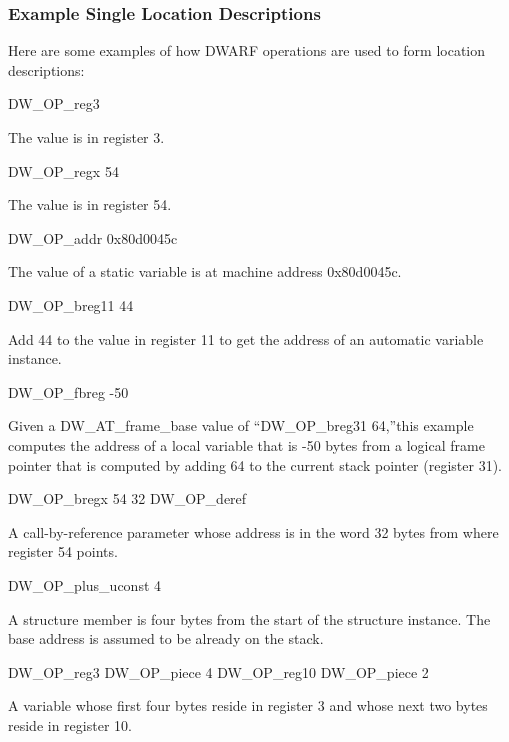 \subsubsection{Example Single Location Descriptions}

Here are some examples of how DWARF operations are used to form location descriptions:

DW\-\_OP\-\_reg3
\begin{myindentpara}{1cm}
The value is in register 3.
\end{myindentpara}

DW\-\_OP\-\_regx 54
\begin{myindentpara}{1cm}
The value is in register 54.
\end{myindentpara}

DW\-\_OP\-\_addr 0x80d0045c
\begin{myindentpara}{1cm}
The value of a static variable is at machine address 0x80d0045c.
\end{myindentpara}

DW\-\_OP\-\_breg11 44
\begin{myindentpara}{1cm}
Add 44 to the value in register 11 to get the address of an automatic
variable instance.
\end{myindentpara}

DW\-\_OP\-\_fbreg -50
\begin{myindentpara}{1cm}
Given a DW\-\_AT\-\_frame\-\_base value of ``DW\-\_OP\-\_breg31 64,''this example
computes the address of a local variable that is -50 bytes from a
logical frame pointer that is computed by adding 64 to the current
stack pointer (register 31).
\end{myindentpara}

DW\-\_OP\-\_bregx 54 32 DW\-\_OP\-\_deref
\begin{myindentpara}{1cm}
A call-by-reference parameter whose address is in the word 32 bytes
from where register 54 points.
\end{myindentpara}

DW\-\_OP\-\_plus\-\_uconst 4
\begin{myindentpara}{1cm}
A structure member is four bytes from the start of the structure
instance. The base address is assumed to be already on the stack.
\end{myindentpara}

DW\-\_OP\-\_reg3 DW\-\_OP\-\_piece 4 DW\-\_OP\-\_reg10 DW\-\_OP\-\_piece 2
\begin{myindentpara}{1cm}
A variable whose first four bytes reside in register 3 and whose next
two bytes reside in register 10.
\end{myindentpara}


